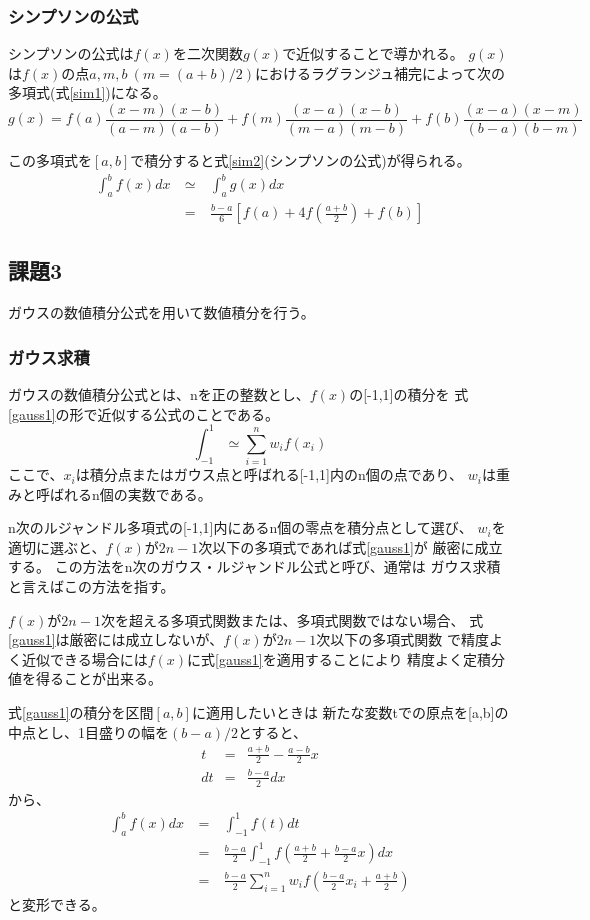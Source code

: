 \documentclass[dvipdfmx]{jsarticle}
\begin{document}
\subsubsection{シンプソンの公式}
シンプソンの公式は$f(x)$を二次関数$g(x)$で近似することで導かれる。
$g(x)$は$f(x)$の点$a,m,b~(m=(a+b)/2)$におけるラグランジュ補完によって次の多項式(式\ref{sim1})になる。
\begin{equation}
  g(x) = f(a)\frac{(x-m)(x-b)}{(a-m)(a-b)}+f(m)\frac{(x-a)(x-b)}{(m-a)(m-b)}+f(b)\frac{(x-a)(x-m)}{(b-a)(b-m)}
  \label{sim1}
\end{equation}

この多項式を$[a,b]$で積分すると式\ref{sim2}(シンプソンの公式)が得られる。
\begin{eqnarray}
  \int_a^b f(x)dx ~&\simeq&~ \int_a^b g(x)dx \nonumber \\
  &=&~ \frac{b-a}{6} \left[f(a)+4f(\frac{a+b}{2})+f(b)\right]
  \label{sim2}
\end{eqnarray}

\subsection{課題3}
ガウスの数値積分公式を用いて数値積分を行う。
\subsubsection{ガウス求積}
ガウスの数値積分公式とは、nを正の整数とし、$f(x)$の[-1,1]の積分を
式\ref{gauss1}の形で近似する公式のことである。
\begin{equation}
  \int_{-1}^{1} \simeq \sum_{i=1}^{n} w_i f(x_i)
  \label{gauss1}
\end{equation}
ここで、$x_i$は積分点またはガウス点と呼ばれる[-1,1]内のn個の点であり、
$w_i$は重みと呼ばれるn個の実数である。

n次のルジャンドル多項式の[-1,1]内にあるn個の零点を積分点として選び、
$w_i$を適切に選ぶと、$f(x)$が$2n-1$次以下の多項式であれば式\ref{gauss1}が
厳密に成立する。
この方法をn次のガウス・ルジャンドル公式と呼び、通常は
ガウス求積と言えばこの方法を指す。

$f(x)$が$2n-1$次を超える多項式関数または、多項式関数ではない場合、
式\ref{gauss1}は厳密には成立しないが、$f(x)$が$2n-1$次以下の多項式関数
で精度よく近似できる場合には$f(x)$に式\ref{gauss1}を適用することにより
精度よく定積分値を得ることが出来る。

式\ref{gauss1}の積分を区間$[a,b]$に適用したいときは
新たな変数tでの原点を[a,b]の中点とし、1目盛りの幅を$(b-a)/2$とすると、
\begin{eqnarray}
  t &=& \frac{a+b}{2} - \frac{a-b}{2}x \nonumber \\
  dt &=& \frac{b-a}{2}dx \nonumber
\end{eqnarray}
から、
\begin{eqnarray}
  \int_a^b f(x)dx ~&=&~ \int_{-1}^{1} f(t)dt \nonumber\\
  &=&~ \frac{b-a}{2} \int_{-1}^{1} f(\frac{a+b}{2} + \frac{b-a}{2}x)dx \\
  &=&~ \frac{b-a}{2} \sum_{i=1}^{n} w_i f(\frac{b-a}{2}x_i + \frac{a+b}{2})
  \label{gauss2}
\end{eqnarray}
と変形できる。
\end{document}

